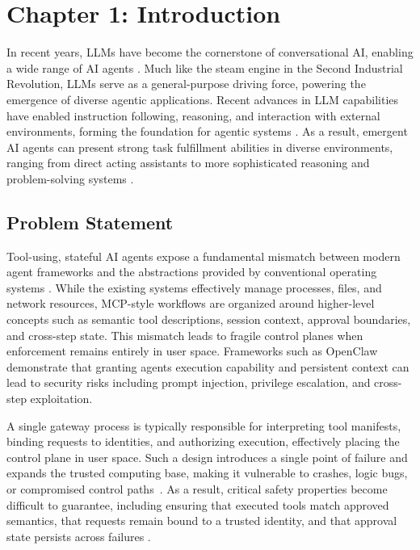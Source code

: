 \section*{Chapter 1: Introduction}
\setcounter{section}{1} \setcounter{subsection}{0}
 {}

In recent years, LLMs have become the cornerstone of conversational AI, enabling a wide range of AI agents \cite{park2023generative, qin2024toolllm}.
Much like the steam engine in the Second Industrial Revolution, LLMs serve as a general-purpose driving force, powering the emergence of diverse agentic applications.
Recent advances in LLM capabilities have enabled instruction following, reasoning, and interaction with external environments, forming the foundation for agentic systems \cite{yao2023react, wang2024agentbench, schick2023toolformer}.
As a result, emergent AI agents can present strong task fulfillment abilities in diverse environments, ranging from direct acting assistants to more sophisticated reasoning and problem-solving systems \cite{mei2024aios,liu2026agentos}.

\subsection{Problem Statement}

Tool-using, stateful AI agents expose a fundamental mismatch between modern agent frameworks and the abstractions provided by conventional operating systems \cite{zhang2024llmos, wu2024agentsystems}. 
While the existing systems effectively manage processes, files, and network resources, MCP-style workflows are organized around higher-level concepts such as semantic tool descriptions, session context, approval boundaries, and cross-step state.
This mismatch leads to fragile control planes when enforcement remains entirely in user space. 
Frameworks such as OpenClaw\cite{openclaw2026,openclaw_security1} demonstrate that granting agents execution capability and persistent context can lead to security risks including prompt injection, privilege escalation, and cross-step exploitation. 

A single gateway process is typically responsible for interpreting tool manifests, binding requests to identities, and authorizing execution, effectively placing the control plane in user space. 
Such a design introduces a single point of failure and expands the trusted computing base, making it vulnerable to crashes, logic bugs, or compromised control paths~\cite{baumann2014arrakis}.
As a result, critical safety properties become difficult to guarantee, including ensuring that executed tools match approved semantics, that requests remain bound to a trusted identity, and that approval state persists across failures \cite{greshake2023prompt, qin2024toolllm}.

